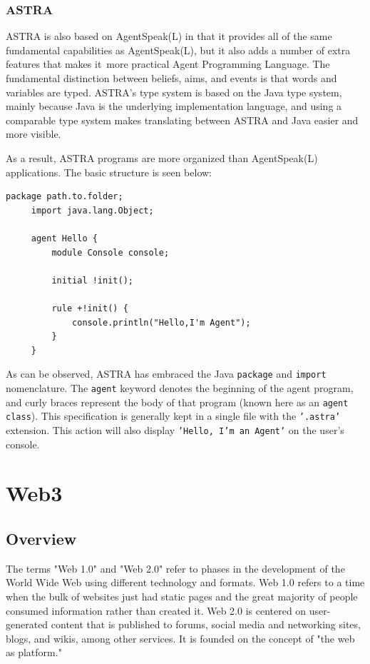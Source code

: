 \subsubsection{\ac{ASTRA}}

\ac{ASTRA} is also based on AgentSpeak(L) in that it provides all of the same fundamental capabilities as AgentSpeak(L), but it also adds a number of extra features that makes it more practical Agent Programming Language. The fundamental distinction between beliefs, aims, and events is that words and variables are typed. \ac{ASTRA}'s type system is based on the Java type system, mainly because Java is the underlying implementation language, and using a comparable type system makes translating between \ac{ASTRA} and Java easier and more visible.

\vspace{.5cm}
As a result, \ac{ASTRA} programs are more organized than AgentSpeak(L) applications. The basic structure is seen below:

\vspace{.5cm}

\begin{lstlisting}[backgroundcolor = \color{white}, frame=none, numbers=none]
     package path.to.folder;
     import java.lang.Object;
     
     agent Hello {
         module Console console;
    
         initial !init();
    
         rule +!init() {
             console.println("Hello,I'm Agent");
         }
     }
\end{lstlisting}

\vspace{.5cm}

As can be observed, \ac{ASTRA} has embraced the Java \texttt{package} and \texttt{import} nomenclature. The \texttt{agent} keyword denotes the beginning of the agent program, and curly braces represent the body of that program (known here as an \texttt{agent class}). This specification is generally kept in a single file with the \texttt{'.astra'} extension. This action will also display \texttt{'Hello, I'm an Agent'} on the user's console.

\section{Web3}

\subsection{Overview}
The terms "Web 1.0" and "Web 2.0" refer to phases in the development of the World Wide Web using different technology and formats. Web 1.0 refers to a time when the bulk of websites just had static pages and the great majority of people consumed information rather than created it. Web 2.0 is centered on user-generated content that is published to forums, social media and networking sites, blogs, and wikis, among other services. It is founded on the concept of "the web as platform."

